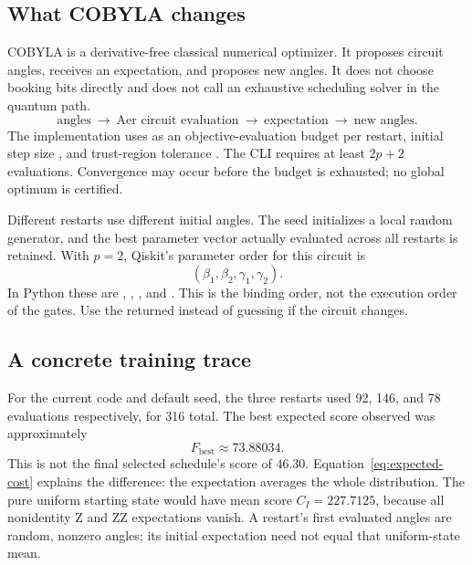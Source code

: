 \subsection{What COBYLA changes}
COBYLA is a derivative-free classical numerical optimizer\cite{cobyla}. It
proposes circuit angles, receives an expectation, and proposes new angles.
It does not choose booking bits directly and does not call an exhaustive
scheduling solver in the quantum path.
\begin{equation*}
\text{angles}\ \longrightarrow\ \text{Aer circuit evaluation}
\ \longrightarrow\ \text{expectation}\ \longrightarrow\ \text{new angles}.
\end{equation*}
The implementation uses  as an objective-evaluation budget per
restart, initial step size , and trust-region tolerance
. The CLI requires at least $2p+2$ evaluations. Convergence may
occur before the budget is exhausted; no global optimum is certified.

Different restarts use different initial angles. The seed initializes a local
random generator, and the best parameter vector actually evaluated across all
restarts is retained. With $p=2$, Qiskit's parameter order for this circuit is
\begin{equation}
(\beta_1,\beta_2,\gamma_1,\gamma_2).
\end{equation}
In Python these are , , , and
. This is the binding order, not the execution order of the gates.
Use the returned  instead of guessing if the circuit changes.

\subsection{A concrete training trace}
For the current code and default seed, the three restarts used 92, 146, and 78
evaluations respectively, for 316 total. The best expected score observed was
approximately
\begin{equation}
F_{\mathrm{best}}\approx73.88034.
\end{equation}
This is not the final selected schedule's score of $46.30$. Equation~\eqref{eq:expected-cost}
explains the difference: the expectation averages the whole distribution.
The pure uniform starting state would have mean score $C_I=227.7125$, because
all nonidentity Z and ZZ expectations vanish. A restart's first evaluated
angles are random, nonzero angles; its initial expectation need not equal that
uniform-state mean.

